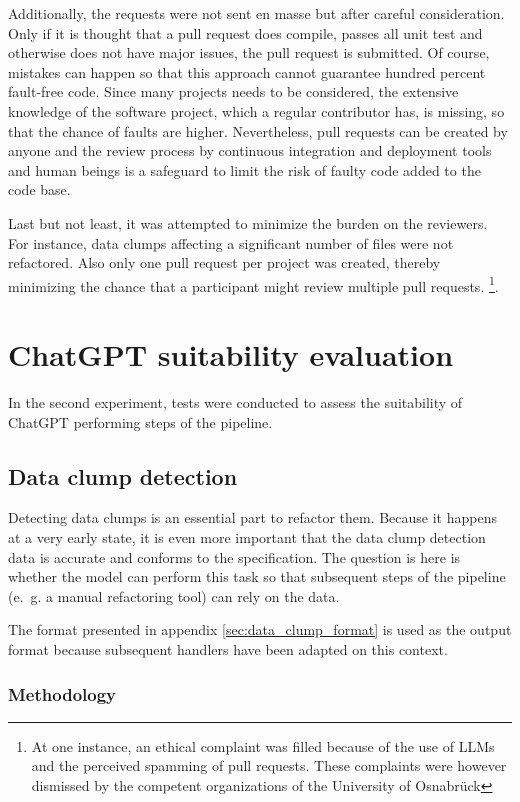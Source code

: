 Additionally, the requests were not sent en masse but after careful consideration. Only if it is thought that a pull request does compile, passes all unit test and otherwise does not have major issues, the pull request is submitted. Of course, mistakes can happen so that this approach cannot guarantee hundred percent fault-free code. Since many projects needs to be considered, the extensive knowledge of the software project, which a regular contributor has, is missing, so that the chance of faults are higher. Nevertheless, pull requests can be created by anyone and the review process by continuous integration and deployment tools and human beings is a safeguard to limit the risk of faulty code added to the code base. 

Last but not least, it was attempted to minimize the burden on the reviewers. For instance, data clumps affecting a significant number of files were not refactored. Also only one pull request per project was created, thereby minimizing the chance that a participant might review multiple pull requests. \footnote{At one instance, an ethical complaint was filled because of the use of \acp{LLM} and the perceived spamming of pull requests. These complaints were however dismissed by the competent organizations of the University of Osnabrück}.  

\section{ChatGPT suitability evaluation}

In the second experiment, tests were conducted to assess the suitability of ChatGPT performing steps of the pipeline.
\subsection{Data clump detection}

Detecting data clumps is an essential part to refactor them. Because it happens at a very early state, it is even more important that the data clump detection data is accurate and conforms to the specification. The question is here is whether the model can perform this task so that subsequent steps of the pipeline (e.~g. a manual refactoring tool) can rely on the data.

The format presented in appendix \ref{sec:data_clump_format} is used as the output format because subsequent handlers have been adapted on this context. 


\subsubsection{Methodology}

